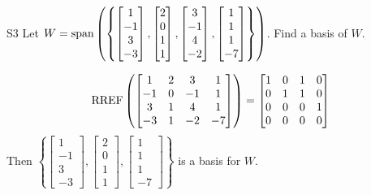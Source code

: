 \documentclass{sbgLAexam}
\begin{document}
\begin{extract}\newpage\end{extract}
\begin{problem}{S3}
Let $W={\rm span}\left( \left\{ \begin{bmatrix} 1 \\ -1 \\ 3 \\ -3 \end{bmatrix},\begin{bmatrix} 2 \\ 0 \\ 1 \\ 1 \end{bmatrix}, \begin{bmatrix} 3 \\ -1 \\ 4 \\ -2 \end{bmatrix},  \begin{bmatrix} 1 \\ 1 \\ 1 \\ -7 \end{bmatrix} \right\}\right)$.  Find a basis of $W$.
\end{problem}
\begin{solution}
$$ \operatorname{RREF} \left( \begin{bmatrix} 1 & 2 & 3 & 1 \\ -1 & 0 & -1 & 1 \\ 3 & 1 & 4 & 1 \\ -3 & 1 & -2 & -7 \end{bmatrix} \right) =  \begin{bmatrix} 1 & 0 & 1 & 0 \\ 0 & 1 & 1 & 0 \\ 0 & 0 & 0 & 1 \\ 0 & 0 & 0 & 0\end{bmatrix}$$
Then  $\left\{ \begin{bmatrix} 1 \\ -1 \\ 3 \\ -3 \end{bmatrix},\begin{bmatrix} 2 \\ 0 \\ 1 \\ 1 \end{bmatrix},   \begin{bmatrix} 1 \\ 1 \\ 1 \\ -7 \end{bmatrix} \right\}$ is a basis for $W$.
\end{solution}
\end{document}
